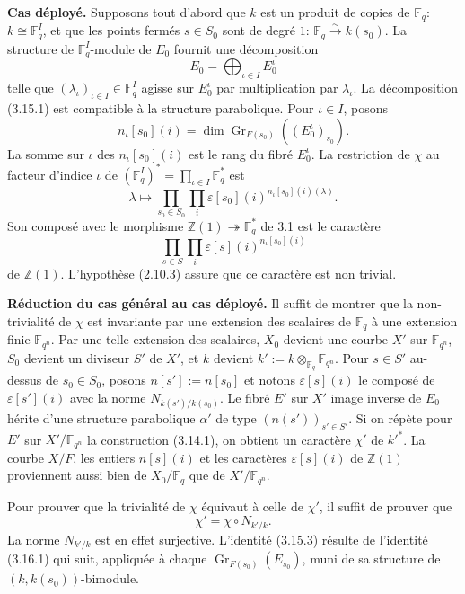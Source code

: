 \documentclass[11pt,a4paper]{article}
\theoremstyle{plain}
\theoremstyle{definition}
\DeclareMathOperator{\Gri}{Gr}
\newcommand{\Z}{\mathbb{Z}}
\newcommand{\F}{\mathbb{F}}
\begin{document}
\textbf{Cas d\'eploy\'e.} Supposons tout d'abord que $k$ est un produit de copies de $\F_q$: $k \cong \F_q^I$, et que les points ferm\'es $s \in S_0$ sont de degr\'e $1$: $\F_q \xrightarrow{\sim} k(s_0)$. La structure de $\F_q^I$-module de $E_0$ fournit une d\'ecomposition
\begin{equation}
E_0 = \bigoplus_{\iota \in I} E_0^\iota
\tag{3.15.1}
\end{equation}
telle que $(\lambda_\iota)_{\iota \in I} \in \F_q^I$ agisse sur $E_0^\iota$ par multiplication par $\lambda_\iota$. La d\'ecomposition (3.15.1) est compatible \`a la structure parabolique. Pour $\iota \in I$, posons
\[
n_\iota[s_0](i) = \dim \Gri_{F(s_0)}((E_0^\iota)_{s_0}).
\]
La somme sur $\iota$ des $n_\iota[s_0](i)$ est le rang du fibr\'e $E_0^\iota$. La restriction de $\chi$ au facteur d'indice $\iota$ de $(\F_q^I)^* = \prod_{\iota \in I} \F_q^*$ est
\begin{equation}
\lambda \mapsto \prod_{s_0 \in S_0} \prod_i \varepsilon[s_0](i)^{n_\iota[s_0](i)(\lambda)}.
\tag{3.15.2}
\end{equation}
Son compos\'e avec le morphisme $\Z(1) \twoheadrightarrow \F_q^*$ de 3.1 est le caract\`ere
\[
\prod_{s \in S} \prod_i \varepsilon[s](i)^{n_\iota[s_0](i)}
\]
de $\Z(1)$. L'hypoth\`ese (2.10.3) assure que ce caract\`ere est non trivial.

\textbf{R\'eduction du cas g\'en\'eral au cas d\'eploy\'e.} Il suffit de montrer que la non-trivialit\'e de $\chi$ est invariante par une extension des scalaires de $\F_q$ \`a une extension finie $\F_{q^n}$. Par une telle extension des scalaires, $X_0$ devient une courbe $X'$ sur $\F_{q^n}$, $S_0$ devient un diviseur $S'$ de $X'$, et $k$ devient $k' := k \otimes_{\F_q} \F_{q^n}$. Pour $s \in S'$ au-dessus de $s_0 \in S_0$, posons $n[s'] := n[s_0]$ et notons $\varepsilon[s](i)$ le compos\'e de $\varepsilon[s'](i)$ avec la norme $N_{k(s')/k(s_0)}$. Le fibr\'e $E'$ sur $X'$ image inverse de $E_0$ h\'erite d'une structure parabolique $\alpha'$ de type $(n(s'))_{s' \in S'}$. Si on r\'ep\`ete pour $E'$ sur $X'/\F_{q^n}$ la construction (3.14.1), on obtient un caract\`ere $\chi'$ de $k'^*$. La courbe $X/F$, les entiers $n[s](i)$ et les caract\`eres $\varepsilon[s](i)$ de $\Z(1)$ proviennent aussi bien de $X_0/\F_q$ que de $X'/\F_{q^n}$.

Pour prouver que la trivialit\'e de $\chi$ \'equivaut \`a celle de $\chi'$, il suffit de prouver que
\begin{equation}
\chi' = \chi \circ N_{k'/k}.
\tag{3.15.3}
\end{equation}
La norme $N_{k'/k}$ est en effet surjective. L'identit\'e (3.15.3) r\'esulte de l'identit\'e (3.16.1) qui suit, appliqu\'ee \`a chaque $\Gri_{F(s_0)}(E_{s_0})$, muni de sa structure de $(k, k(s_0))$-bimodule.
\end{document}
